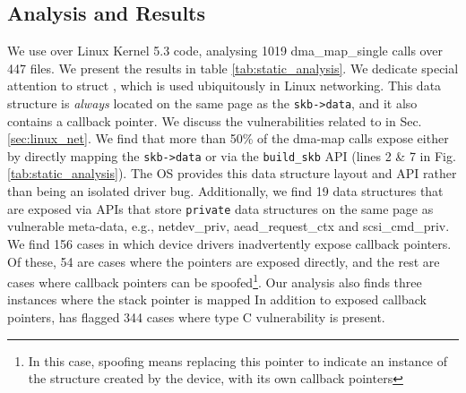 \subsection{Analysis and Results}
We use \tool over Linux Kernel 5.3 code,
analysing 1019 dma\_map\_single calls over 447 files. We present the results in table \ref{tab:static_analysis}. We dedicate special attention to struct \shinfo, which is used ubiquitously in Linux networking. This data structure is \textit{always} located on the same page as the \texttt{skb->data}, and it also contains a callback pointer. We discuss the vulnerabilities related to \shinfo in Sec. \ref{sec:linux_net}. We find that more than 50\% of the dma-map calls expose \shinfo either by directly mapping the \texttt{skb->data} or via the \texttt{build\_skb} API (lines 2 \& 7 in Fig. \ref{tab:static_analysis}). The OS provides this data structure layout and API rather than being an isolated driver bug. Additionally, we find 19 data structures that are exposed via APIs that store \texttt{private} data structures on the same page as vulnerable meta-data, e.g., netdev\_priv, aead\_request\_ctx and scsi\_cmd\_priv. We find 156 cases in which device drivers inadvertently expose callback pointers. Of these, 54 are cases where the pointers are exposed directly, and the rest are cases where callback pointers can be spoofed\footnote{In this case, spoofing means replacing this pointer to indicate an instance of the structure created by the device, with its own callback pointers}.
Our analysis also finds three instances where the stack pointer is mapped
In addition to exposed callback pointers, \tool has flagged 344 cases where type C vulnerability is present. 

